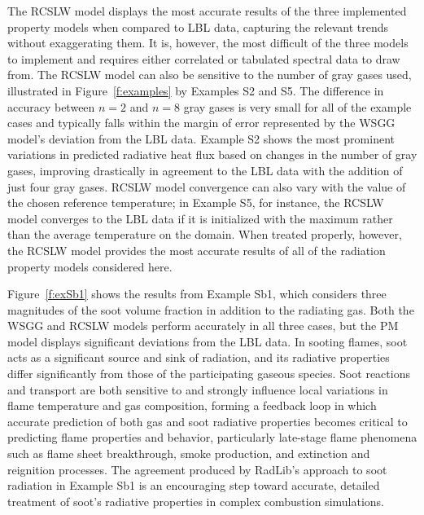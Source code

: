 \documentclass[preprint,12pt]{elsarticle}
\begin{document}
The RCSLW model displays the most accurate results of the three implemented property models when compared to LBL data, capturing the relevant trends without exaggerating them. It is, however, the most difficult of the three models to implement and requires either correlated or tabulated spectral data to draw from. The RCSLW model can also be sensitive to the number of gray gases used, illustrated in Figure~\ref{f:examples} by Examples S2 and S5. The difference in accuracy between $n=2$ and $n=8$ gray gases is very small for all of the example cases and typically falls within the margin of error represented by the WSGG model's deviation from the LBL data. Example S2 shows the most prominent variations in predicted radiative heat flux based on changes in the number of gray gases, improving drastically in agreement to the LBL data with the addition of just four gray gases. RCSLW model convergence can also vary with the value of the chosen reference temperature; in Example S5, for instance, the RCSLW model converges to the LBL data if it is initialized with the maximum rather than the average temperature on the domain. When treated properly, however, the RCSLW model provides the most accurate results of all of the radiation property models considered here. 

Figure~\ref{f:exSb1} shows the results from Example Sb1, which considers three magnitudes of the soot volume fraction in addition to the radiating gas. Both the WSGG and RCSLW models perform accurately in all three cases, but the PM model displays significant deviations from the LBL data. In sooting flames, soot acts as a significant source and sink of radiation, and its radiative properties differ significantly from those of the participating gaseous species. Soot reactions and transport are both sensitive to and strongly influence local variations in flame temperature and gas composition, forming a feedback loop in which accurate prediction of both gas and soot radiative properties becomes critical to predicting flame properties and behavior, particularly late-stage flame phenomena such as flame sheet breakthrough, smoke production, and extinction and reignition processes. The agreement produced by RadLib's approach to soot radiation in Example Sb1 is an encouraging step toward accurate, detailed treatment of soot's radiative properties in complex combustion simulations. 



\end{document}
